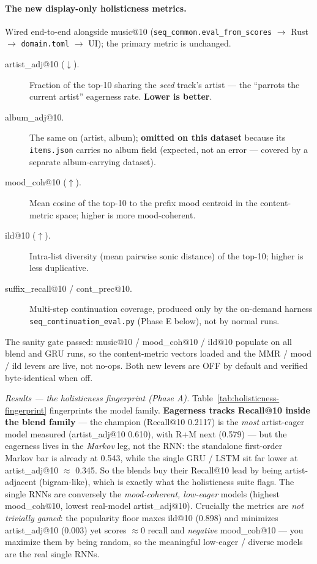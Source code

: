 \documentclass[11pt]{article}
\begin{document}
\paragraph{The new display-only holisticness metrics.} Wired end-to-end alongside
music@10 (\texttt{seq\_common.eval\_from\_scores} $\to$ Rust $\to$
\texttt{domain.toml} $\to$ UI); the primary metric is unchanged.
\begin{description}
  \item[artist\_adj@10 ($\downarrow$).] Fraction of the top-10 sharing the
  \emph{seed} track's artist --- the ``parrots the current artist'' eagerness rate.
  \textbf{Lower is better}.
  \item[album\_adj@10.] The same on (artist, album); \textbf{omitted on this
  dataset} because its \texttt{items.json} carries no album field (expected, not an
  error --- covered by a separate album-carrying dataset).
  \item[mood\_coh@10 ($\uparrow$).] Mean cosine of the top-10 to the prefix mood
  centroid in the content-metric space; higher is more mood-coherent.
  \item[ild@10 ($\uparrow$).] Intra-list diversity (mean pairwise sonic distance) of
  the top-10; higher is less duplicative.
  \item[suffix\_recall@10 / cont\_prec@10.] Multi-step continuation coverage,
  produced only by the on-demand harness \texttt{seq\_continuation\_eval.py}
  (Phase E below), not by normal runs.
\end{description}
The sanity gate passed: music@10 / mood\_coh@10 / ild@10 populate on all blend and
GRU runs, so the content-metric vectors loaded and the MMR / mood / ild levers are
live, not no-ops. Both new levers are OFF by default and verified byte-identical
when off.

\emph{Results --- the holisticness fingerprint (Phase A).} Table~\ref{tab:holisticness-fingerprint}
fingerprints the model family. \textbf{Eagerness tracks Recall@10 inside the blend
family} --- the champion (Recall@10 \num{0.2117}) is the \emph{most} artist-eager
model measured (artist\_adj@10 \num{0.610}), with R+M next (\num{0.579}) --- but the
eagerness lives in the \emph{Markov} leg, not the RNN: the standalone first-order
Markov bar is already at \num{0.543}, while the single GRU / LSTM sit far lower at
artist\_adj@10 $\approx$ \num{0.345}. So the blends buy their Recall@10 lead by being
artist-adjacent (bigram-like), which is exactly what the holisticness suite flags.
The single RNNs are conversely the \emph{mood-coherent, low-eager} models (highest
mood\_coh@10, lowest real-model artist\_adj@10). Crucially the metrics are \emph{not
trivially gamed}: the popularity floor maxes ild@10 (\num{0.898}) and minimizes
artist\_adj@10 (\num{0.003}) yet scores $\approx 0$ recall and \emph{negative}
mood\_coh@10 --- you maximize them by being random, so the meaningful low-eager /
diverse models are the real single RNNs.
\end{document}
